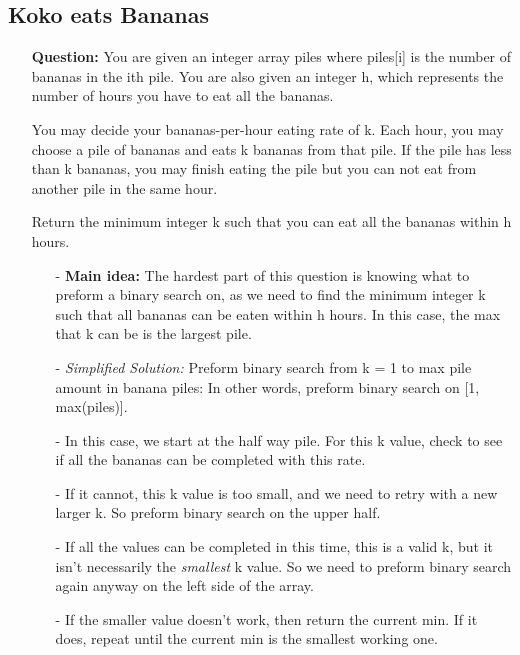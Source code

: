 \documentclass[12pt]{article}
\begin{document}
\subsection{Koko eats Bananas}
\begin{enumerate}
  \item[] \textbf{Question:} You are given an integer array piles where piles[i] is the number of bananas in the ith pile. You are also given an integer h, which represents the number of hours you have to eat all the bananas.

You may decide your bananas-per-hour eating rate of k. Each hour, you may choose a pile of bananas and eats k bananas from that pile. If the pile has less than k bananas, you may finish eating the pile but you can not eat from another pile in the same hour.

Return the minimum integer k such that you can eat all the bananas within h hours.

    \begin{enumerate}
      \item[-] \textbf{Main idea:} The hardest part of this question is knowing what to preform a binary search on, as we need to find the minimum integer k such that all bananas can be eaten within h hours. In this case, the max that k can be is the largest pile.
      \item[-] \textit{Simplified Solution:} Preform binary search from k = 1 to max pile amount in banana piles: In other words, preform binary search on [1, max(piles)].
      \item[-] In this case, we start at the half way pile. For this k value, check to see if all the bananas can be completed with this rate.
      \item[-] If it cannot, this k value is too small, and we need to retry with a new larger k. So preform binary search on the upper half. 
      \item[-] If all the values can be completed in this time, this is a valid k, but it isn't necessarily the \textit{smallest} k value. So we need to preform binary search again anyway on the left side of the array. 
      \item[-] If the smaller value doesn't work, then return the current min. If it does, repeat until the current min is the smallest working one.

    \end{enumerate}
\end{enumerate}
\end{document}

